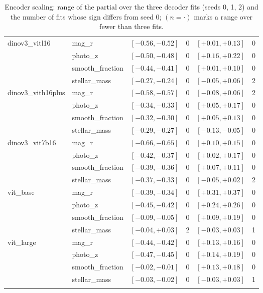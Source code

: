 \begin{table}[h]
\begin{tabular}{llcccc}
\addlinespace[2pt]
dinov3\_vitl16 & mag\_r & $[-0.56, -0.52]$ & 0 & $[+0.01, +0.13]$ & 0 \\
 & photo\_z & $[-0.50, -0.48]$ & 0 & $[+0.16, +0.22]$ & 0 \\
 & smooth\_fraction & $[-0.44, -0.41]$ & 0 & $[+0.01, +0.10]$ & 0 \\
 & stellar\_mass & $[-0.27, -0.24]$ & 0 & $[-0.05, +0.06]$ & 2 \\
\addlinespace[2pt]
dinov3\_vith16plus & mag\_r & $[-0.58, -0.57]$ & 0 & $[-0.08, +0.06]$ & 2 \\
 & photo\_z & $[-0.34, -0.33]$ & 0 & $[+0.05, +0.17]$ & 0 \\
 & smooth\_fraction & $[-0.32, -0.30]$ & 0 & $[+0.05, +0.13]$ & 0 \\
 & stellar\_mass & $[-0.29, -0.27]$ & 0 & $[-0.13, -0.05]$ & 0 \\
\addlinespace[2pt]
dinov3\_vit7b16 & mag\_r & $[-0.66, -0.65]$ & 0 & $[+0.10, +0.15]$ & 0 \\
 & photo\_z & $[-0.42, -0.37]$ & 0 & $[+0.02, +0.17]$ & 0 \\
 & smooth\_fraction & $[-0.39, -0.36]$ & 0 & $[+0.07, +0.11]$ & 0 \\
 & stellar\_mass & $[-0.37, -0.33]$ & 0 & $[-0.05, +0.02]$ & 2 \\
\addlinespace[2pt]
vit\_base & mag\_r & $[-0.39, -0.34]$ & 0 & $[+0.31, +0.37]$ & 0 \\
 & photo\_z & $[-0.45, -0.42]$ & 0 & $[+0.24, +0.26]$ & 0 \\
 & smooth\_fraction & $[-0.09, -0.05]$ & 0 & $[+0.09, +0.19]$ & 0 \\
 & stellar\_mass & $[-0.04, +0.03]$ & 2 & $[-0.03, +0.03]$ & 1 \\
\addlinespace[2pt]
vit\_large & mag\_r & $[-0.44, -0.42]$ & 0 & $[+0.13, +0.16]$ & 0 \\
 & photo\_z & $[-0.47, -0.45]$ & 0 & $[+0.14, +0.19]$ & 0 \\
 & smooth\_fraction & $[-0.02, -0.01]$ & 0 & $[+0.13, +0.18]$ & 0 \\
 & stellar\_mass & $[-0.03, -0.02]$ & 0 & $[-0.03, +0.03]$ & 1 \\
\addlinespace[2pt]
\bottomrule
\end{tabular}
\caption{Encoder scaling: range of the partial over the three decoder fits (seeds 0, 1, 2) and the number of fits whose sign differs from seed 0; $(n=\cdot)$ marks a range over fewer than three fits.}
\label{tab:scaling_robust}
\end{table}
